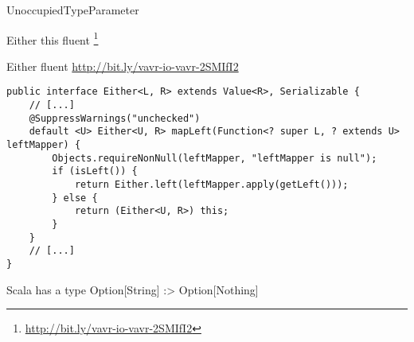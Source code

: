 \begin{pattern}{UnoccupiedTypeParameter}

\instances{}

Either this fluent \api{}
\footnote{\url{http://bit.ly/vavr-io-vavr-2SMIfI2}}

\begin{listing}[h!]
\caption{Either fluent \api{}  \url{http://bit.ly/vavr-io-vavr-2SMIfI2}  }
\begin{verbatim}
public interface Either<L, R> extends Value<R>, Serializable {
    // [...]
    @SuppressWarnings("unchecked")
    default <U> Either<U, R> mapLeft(Function<? super L, ? extends U> leftMapper) {
        Objects.requireNonNull(leftMapper, "leftMapper is null");
        if (isLeft()) {
            return Either.left(leftMapper.apply(getLeft()));
        } else {
            return (Either<U, R>) this;
        }
    }
    // [...]
}
\end{verbatim}
\end{listing}

\detection{}

\discussion{}

Scala has a  type
Option[String] :> Option[Nothing]

\related{}

\end{pattern}
